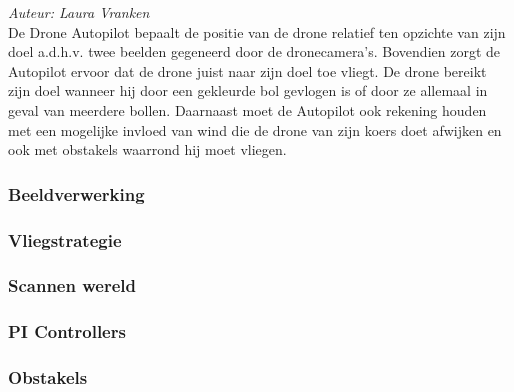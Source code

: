 {\em Auteur: Laura Vranken}\\

\noindent
De Drone Autopilot bepaalt de positie van de drone relatief ten opzichte van zijn doel a.d.h.v. twee beelden gegeneerd door de dronecamera's. Bovendien zorgt de Autopilot ervoor dat de drone juist naar zijn doel toe vliegt. De drone bereikt zijn doel wanneer hij door een gekleurde bol gevlogen is of door ze allemaal in geval van meerdere bollen.  Daarnaast moet de Autopilot ook rekening houden met een mogelijke invloed van wind die de drone van zijn koers doet afwijken en ook met obstakels waarrond hij moet vliegen.

\subsubsection{Beeldverwerking}
\label{subsec: Beeldverwerking}


\subsubsection{Vliegstrategie}
\label{subsec: Vliegstrategie}


\subsubsection{Scannen wereld}
\label{subsec: Scannen wereld}


\subsubsection{PI Controllers}
\label{subsec: PI Controllers}


\subsubsection{Obstakels}
\label{subsec: Obstakels}



















